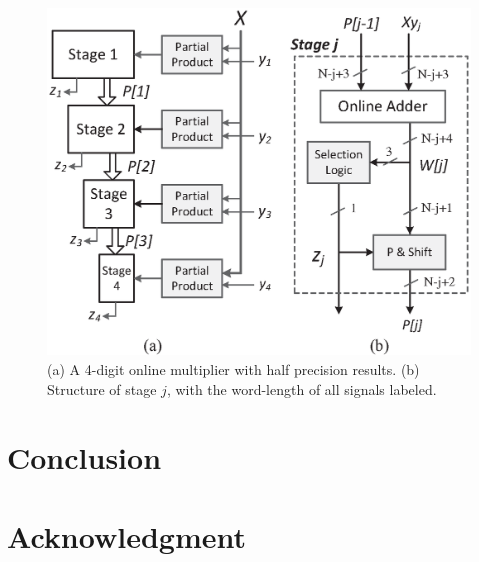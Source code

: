 \documentclass[10pt, conference, compsocconf]{IEEEtran}
\begin{document}
\begin{figure}[tbp]
  \centering
  \includegraphics[width=.42\textwidth]{./figures/ParallelMult_MSDhalf.eps}
  \caption{(a) A 4-digit online multiplier with half precision results. (b) Structure of stage $j$, with the word-length of all signals labeled.}
    \vspace{-2ex}
  \label{Fig:PM_half}
\end{figure}

\section{Conclusion}

\section*{Acknowledgment}





\end{document}
